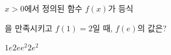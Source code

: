 \hspace*{2mm}\begin{minipage}[t]{\dimexpr\linewidth-2mm\relax}\vspace{0pt}
$x>0$에서 정의된 함수 $f(x)$가 등식 \par\smallskip{}\par\smallskip\noindent 을 만족시키고 $f(1)=2$일 때, $f(e)$의 값은?
\begin{choices32}{$1$}{$e$}{$2e$}{$e^2$}{$2e^2$}\end{choices32}\end{minipage}
